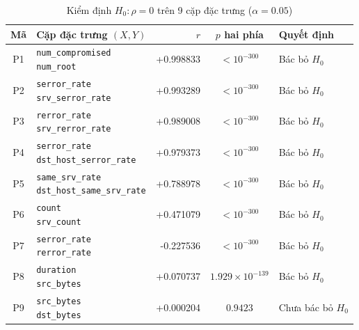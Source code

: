 \begin{table}[htbp]
\centering
\caption{Kiểm định $H_0:\rho=0$ trên 9 cặp đặc trưng ($\alpha=0.05$)}
\label{tab:pearson-tests}
\footnotesize
\setlength{\tabcolsep}{4pt}
\renewcommand{\arraystretch}{1.10}
\begin{tabular}{@{}cp{6.3cm}rcl@{}}
\toprule
Mã & Cặp đặc trưng $(X,Y)$ & $r$ & $p$ hai phía & Quyết định\\
\midrule
P1 & \shortstack[l]{\texttt{num\_compromised}\\ \texttt{num\_root}} & +0.998833 & $<10^{-300}$ & Bác bỏ $H_0$ \\
P2 & \shortstack[l]{\texttt{serror\_rate}\\ \texttt{srv\_serror\_rate}} & +0.993289 & $<10^{-300}$ & Bác bỏ $H_0$ \\
P3 & \shortstack[l]{\texttt{rerror\_rate}\\ \texttt{srv\_rerror\_rate}} & +0.989008 & $<10^{-300}$ & Bác bỏ $H_0$ \\
P4 & \shortstack[l]{\texttt{serror\_rate}\\ \texttt{dst\_host\_serror\_rate}} & +0.979373 & $<10^{-300}$ & Bác bỏ $H_0$ \\
P5 & \shortstack[l]{\texttt{same\_srv\_rate}\\ \texttt{dst\_host\_same\_srv\_rate}} & +0.788978 & $<10^{-300}$ & Bác bỏ $H_0$ \\
P6 & \shortstack[l]{\texttt{count}\\ \texttt{srv\_count}} & +0.471079 & $<10^{-300}$ & Bác bỏ $H_0$ \\
P7 & \shortstack[l]{\texttt{serror\_rate}\\ \texttt{rerror\_rate}} & -0.227536 & $<10^{-300}$ & Bác bỏ $H_0$ \\
P8 & \shortstack[l]{\texttt{duration}\\ \texttt{src\_bytes}} & +0.070737 & $1.929\times10^{-139}$ & Bác bỏ $H_0$ \\
P9 & \shortstack[l]{\texttt{src\_bytes}\\ \texttt{dst\_bytes}} & +0.000204 & $0.9423$ & Chưa bác bỏ $H_0$ \\
\bottomrule
\end{tabular}
\end{table}
